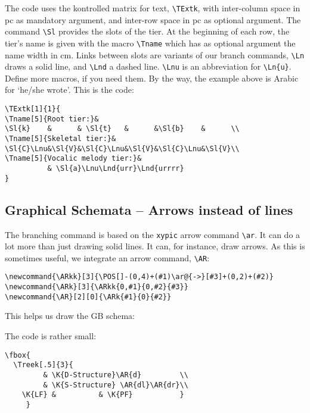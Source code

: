 \documentclass[12pt,a4paper]{article}
\begin{document}

The code uses the kontrolled matrix for text, \verb|\TExtk|, with inter-column
space in pc as mandatory argument, and inter-row space in pc as optional argument. The
command \verb|\Sl| provides the slots of the tier. At the beginning of each row, the
tier's name is given with the macro \verb|\Tname| which has as optional argument the
name width in cm. Links between slots are variants of our branch commands, \verb|\Ln|
draws a solid line, and \verb|\Lnd| a dashed line. \verb|\Lnu| is an abbreviation for
\verb|\Ln{u}|. Define more macros, if you need them. By the way, the example above is
Arabic for `he/she wrote'. This is the code:\newpage

\begin{verbatim}
\TExtk[1]{1}{ 
\Tname[5]{Root tier:}&
\Sl{k}    &      & \Sl{t}   &      &\Sl{b}    &      \\
\Tname[5]{Skeletal tier:}&
\Sl{C}\Lnu&\Sl{V}&\Sl{C}\Lnu&\Sl{V}&\Sl{C}\Lnu&\Sl{V}\\
\Tname[5]{Vocalic melody tier:}&
          & \Sl{a}\Lnu\Lnd{urr}\Lnd{urrrr} 
}
\end{verbatim}


\subsection{Graphical Schemata -- Arrows instead of lines}

The branching command is based on the \texttt{xypic} arrow command
\verb|\ar|. It can do a lot more than just drawing solid lines. It can, for
instance, draw arrows. As this is sometimes useful, we integrate an arrow
command, \verb|\AR|:

\begin{verbatim}
\newcommand{\ARkk}[3]{\POS[]-(0,4)+(#1)\ar@{->}[#3]+(0,2)+(#2)}
\newcommand{\ARk}[3]{\ARkk{0,#1}{0,#2}{#3}}
\newcommand{\AR}[2][0]{\ARk{#1}{0}{#2}}
\end{verbatim}

This helps us draw the GB schema:

\begin{minipage}[t]{4cm}
\end{minipage}
\begin{minipage}[t]{10cm}
  The code is rather small:
\begin{verbatim}
\fbox{
  \Treek[.5]{3}{ 
         & \K{D-Structure}\AR{d}         \\
         & \K{S-Structure} \AR{dl}\AR{dr}\\
    \K{LF} &          & \K{PF}           } 
     }
\end{verbatim}
\end{minipage}
\end{document}
